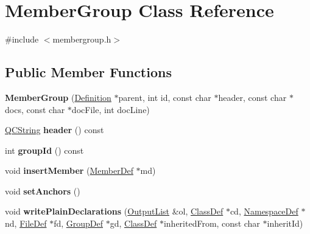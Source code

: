 \hypertarget{class_member_group}{}\section{Member\+Group Class Reference}
\label{class_member_group}


{\ttfamily \#include $<$membergroup.\+h$>$}

\subsection*{Public Member Functions}
\begin{DoxyCompactItemize}
\item 
\mbox{\label{class_member_group_a0cedcc622535e28b05a54b7d843a94f9}} 
{\bfseries Member\+Group} (\mbox{\hyperlink{class_definition}{Definition}} $\ast$parent, int id, const char $\ast$header, const char $\ast$docs, const char $\ast$doc\+File, int doc\+Line)
\item 
\mbox{\label{class_member_group_a918bd808efb147a24b25c5246425d5bf}} 
\mbox{\hyperlink{class_q_c_string}{Q\+C\+String}} {\bfseries header} () const
\item 
\mbox{\label{class_member_group_a25d5f6dce1695c96eaddefd8b54fce43}} 
int {\bfseries group\+Id} () const
\item 
\mbox{\label{class_member_group_ad7b02bac5d0ed254d5c979b19cf4ae1e}} 
void {\bfseries insert\+Member} (\mbox{\hyperlink{class_member_def}{Member\+Def}} $\ast$md)
\item 
\mbox{\label{class_member_group_a325068f062701fe19500cfe9f88e9ef2}} 
void {\bfseries set\+Anchors} ()
\item 
\mbox{\label{class_member_group_a12b86dc316ffa3e35a32459f4cb1c11f}} 
void {\bfseries write\+Plain\+Declarations} (\mbox{\hyperlink{class_output_list}{Output\+List}} \&ol, \mbox{\hyperlink{class_class_def}{Class\+Def}} $\ast$cd, \mbox{\hyperlink{class_namespace_def}{Namespace\+Def}} $\ast$nd, \mbox{\hyperlink{class_file_def}{File\+Def}} $\ast$fd, \mbox{\hyperlink{class_group_def}{Group\+Def}} $\ast$gd, \mbox{\hyperlink{class_class_def}{Class\+Def}} $\ast$inherited\+From, const char $\ast$inherit\+Id)

\end{DoxyCompactItemize}

